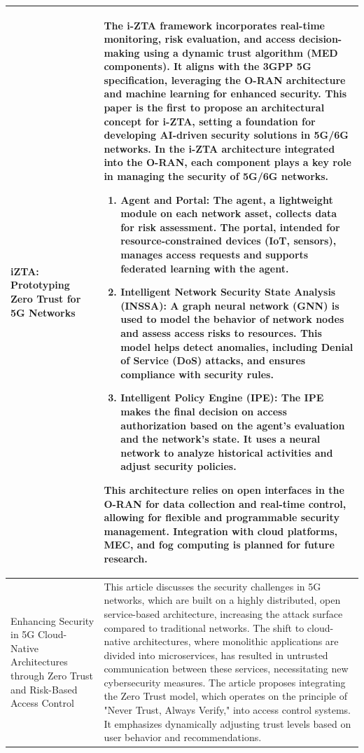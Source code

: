\documentclass{report}
\begin{document}
\begin{longtable}{|p{4cm}|p{12cm}|}
    iZTA: Prototyping Zero Trust for 5G Networks & 
    \parbox[t]{12cm}{
        The i-ZTA framework incorporates real-time monitoring, risk evaluation, and access decision-making using a dynamic trust algorithm (MED components). It aligns with the 3GPP 5G specification, leveraging the O-RAN architecture and machine learning for enhanced security. This paper is the first to propose an architectural concept for i-ZTA, setting a foundation for developing AI-driven security solutions in 5G/6G networks. In the i-ZTA architecture integrated into the O-RAN, each component plays a key role in managing the security of 5G/6G networks. 
        \begin{enumerate}
            \item Agent and Portal: The agent, a lightweight module on each network asset, collects data for risk assessment. The portal, intended for resource-constrained devices (IoT, sensors), manages access requests and supports federated learning with the agent.
            \item Intelligent Network Security State Analysis (INSSA): A graph neural network (GNN) is used to model the behavior of network nodes and assess access risks to resources. This model helps detect anomalies, including Denial of Service (DoS) attacks, and ensures compliance with security rules.
            \item Intelligent Policy Engine (IPE): The IPE makes the final decision on access authorization based on the agent's evaluation and the network's state. It uses a neural network to analyze historical activities and adjust security policies.
        \end{enumerate}
        This architecture relies on open interfaces in the O-RAN for data collection and real-time control, allowing for flexible and programmable security management. Integration with cloud platforms, MEC, and fog computing is planned for future research.
    } \\ 
    \hline
        Enhancing Security in 5G Cloud-Native Architectures through Zero Trust and Risk-Based Access Control & This article discusses the security challenges in 5G networks, which are built on a highly distributed, open service-based architecture, increasing the attack surface compared to traditional networks. The shift to cloud-native architectures, where monolithic applications are divided into microservices, has resulted in untrusted communication between these services, necessitating new cybersecurity measures. The article proposes integrating the Zero Trust model, which operates on the principle of "Never Trust, Always Verify," into access control systems. It emphasizes dynamically adjusting trust levels based on user behavior and recommendations. 


\end{longtable}
\end{document}
